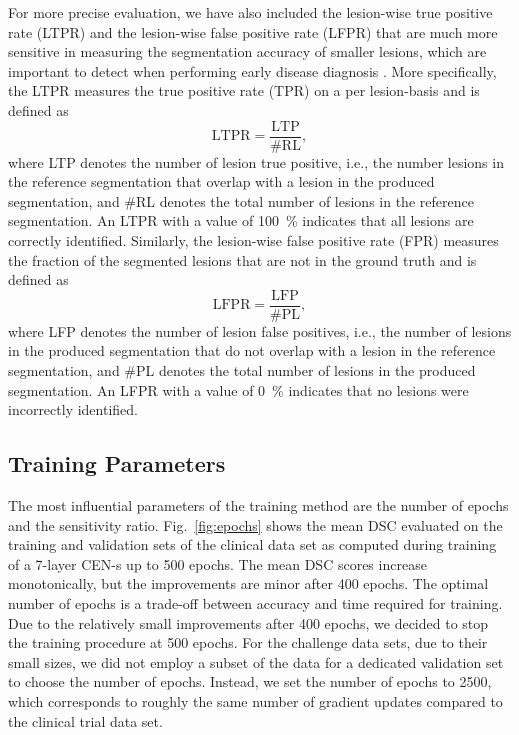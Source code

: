 For more precise evaluation, we have also included the lesion-wise true positive
rate (LTPR) and the lesion-wise false positive rate (LFPR) that are much more
sensitive in measuring the segmentation accuracy of smaller lesions, which are
important to detect when performing early disease diagnosis
\cite{garcia2013review}.
More specifically, the LTPR measures the true positive rate (TPR) on a per
lesion-basis and is defined as
\begin{equation}
\text{LTPR} = \frac{\text{LTP}}{\text{\#RL}},
\end{equation}
where LTP denotes the number of lesion true positive, i.e., the number
lesions in the reference segmentation that overlap with a lesion in the produced
segmentation, and \#RL denotes the total number of lesions in the reference
segmentation. An LTPR with a value of \SI{100}{\percent} indicates that all
lesions are correctly identified. Similarly, the lesion-wise false positive rate
(FPR) measures the fraction of the segmented lesions that are not in the ground
truth and is defined as
\begin{equation}
\text{LFPR} = \frac{\text{LFP}}{\text{\#PL}},
\end{equation}
where LFP denotes the number of lesion false positives, i.e., the number of
lesions in the produced segmentation that do not overlap with a lesion in the
reference segmentation, and \#PL denotes the total number of lesions in the
produced segmentation. An LFPR with a value of \SI{0}{\percent} indicates that
no lesions were incorrectly identified.

\subsection{Training Parameters}
The most influential parameters of the training method are the number of epochs
and the sensitivity ratio. Fig.~\ref{fig:epochs} shows the mean DSC evaluated on
the training and validation sets of the clinical data set as computed during
training of a \mbox{7-layer} CEN-s up to 500 epochs.
The mean DSC scores increase monotonically, but the improvements are minor after
400 epochs. The optimal number of epochs is a trade-off between accuracy and
time required for training. Due to the relatively small improvements after 400
epochs, we decided to stop the training procedure at 500 epochs. For the
challenge data sets, due to their small sizes, we did not employ a subset of the
data for a dedicated validation set to choose the number of epochs. Instead, we
set the number of epochs to 2500, which corresponds to roughly the same number
of gradient updates compared to the clinical trial data set.

